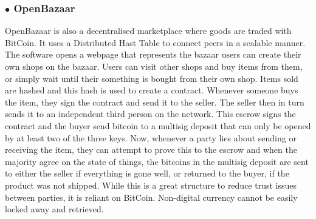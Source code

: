 \subsubsection*{$\bullet$ OpenBazaar}
OpenBazaar \cite{bazaar} is also a decentralised marketplace where goods are traded with BitCoin.
It uses a Distributed Hast Table to connect peers in a scalable manner.
The software opens a webpage that represents the bazaar users can create their own shops on the bazaar.
Users can visit other shops and buy items from them, or simply wait until their something is bought from their own shop.
Items sold are hashed and this hash is used to create a contract.
Whenever someone buys the item, they sign the contract and send it to the seller.
The seller then in turn sends it to an independent third person on the network.
This escrow signs the contract and the buyer send bitcoin to a multisig deposit that can only be opened by at least two of the three keys.
Now, whenever a party lies about sending or receiving the item, they can attempt to prove this to the escrow and when the majority agree on the state of things, the bitcoins in the multisig deposit are sent to either the seller if everything is gone well, or returned to the buyer, if the product was not shipped.
While this is a great structure to reduce trust issues between parties, it is reliant on BitCoin. Non-digital currency cannot be easily locked away and retrieved.